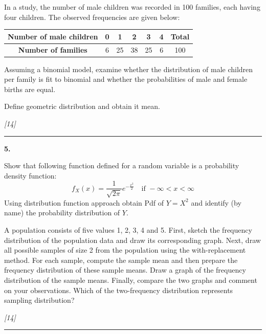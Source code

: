 \documentclass[11pt,a4paper]{article}
\newcommand{\pts}[1]{\hfill   \textit{[#1]}}
\begin{document}
\begin{parts}
  \item In a study, the number of male children was recorded in 100 families, each having four children. The observed frequencies are given below:
  
\begin{center}
  
\begin{tabular}{|c|c|c|c|c|c|c|}
  \hline
   \textbf{Number of male children} & 0 & 1 & 2 & 3 & 4 &   \textbf{Total} \\
  \hline
   \textbf{Number of families} & 6 & 25 & 38 & 25 & 6 & 100 \\
  \hline
  \end{tabular}
  \end{center}
  Assuming a binomial model, examine whether the distribution of male children per family is fit to binomial and whether the probabilities of male and female births are equal.
  \item Define geometric distribution and obtain it mean.
\end{parts}\pts{14}

\medskip\rule{\linewidth}{0.2pt}\medskip




\noindent   \textbf{5.}

\begin{parts}
  \item Show that following function defined for a random variable is a probability density function:
  \[
  f_X(x) = \frac{1}{\sqrt{2\pi}} e^{-\frac{x^2}{2}} \quad  \text{if } -\infty < x < \infty
  \]
  Using distribution function approach obtain Pdf of $Y = X^2$ and identify (by name) the probability distribution of $Y$.
  \item A population consists of five values 1, 2, 3, 4 and 5. First, sketch the frequency distribution of the population data and draw its corresponding graph. Next, draw all possible samples of size 2 from the population using the with-replacement method. For each sample, compute the sample mean and then prepare the frequency distribution of these sample means. Draw a graph of the frequency distribution of the sample means. Finally, compare the two graphs and comment on your observations. Which of the two-frequency distribution represents sampling distribution?
\end{parts}\pts{14}

\medskip\rule{\linewidth}{0.2pt}\medskip
\end{document}
